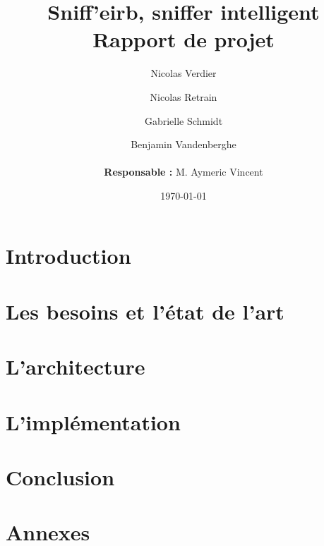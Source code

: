 \documentclass[a4]{report}
\begin{document}
		
	\title{\Large{\textbf{Sniff'eirb, sniffer intelligent}}\\\Huge{\textbf{Rapport de projet}}}
	\author{
	Nicolas Verdier \and Nicolas Retrain \and Gabrielle Schmidt \and Benjamin Vandenberghe \\
	\\
	\textbf{Responsable : } M. Aymeric Vincent}
	\date{\today}
	
	\maketitle

	\tableofcontents{}
	\newpage
	
	\chapter*{Introduction}
		

	

		
	\chapter{Les besoins et l'état de l'art}
		
			
	\chapter{L'architecture}
		
		
	\chapter{L'implémentation}
		
	
						
	\chapter*{Conclusion}
		
	
	\chapter*{Annexes}
		
	
\end{document}
